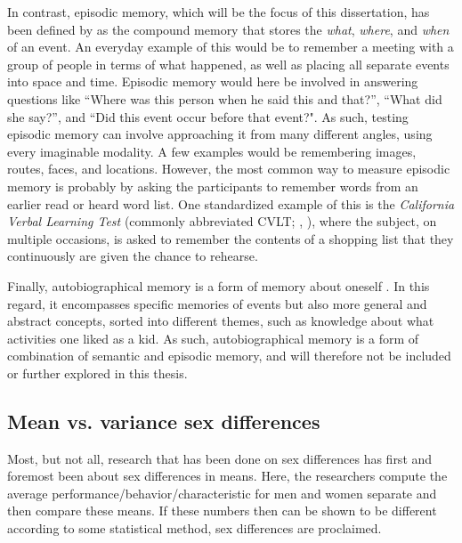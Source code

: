 In contrast, episodic memory, which will be the focus of this dissertation, has been defined by \textcite{Tulving1972,Tulving2002} as the compound memory that stores the \emph{what}, \emph{where}, and \emph{when} of an event. An everyday example of this would be to remember a meeting with a group of people in terms of what happened, as well as placing all separate events into space and time. Episodic memory would here be involved in answering questions like ``Where was this person when he said this and that?'', ``What did she say?'', and ``Did this event occur before that event?". As such, testing episodic memory can involve approaching it from many different angles, using every imaginable modality. A few examples would be remembering images, routes, faces, and locations. However, the most common way to measure episodic memory is probably by asking the participants to remember words from an earlier read or heard word list. One standardized example of this is the \emph{California Verbal Learning Test} (commonly abbreviated CVLT; \citeauthor{Delis1987}, \citeyear{Delis1987}), where the subject, on multiple occasions, is asked to remember the contents of a shopping list that they continuously are given the chance to rehearse.

Finally, autobiographical memory is a form of memory about oneself \parencite{Conway2000,Conway2005}. In this regard, it encompasses specific memories of events but also more general and abstract concepts, sorted into different themes, such as knowledge about what activities one liked as a kid. As such, autobiographical memory is a form of combination of semantic and episodic memory, and will therefore not be included or further explored in this thesis.

\subsection{Mean vs. variance sex differences} \label{Mean_vs_variance}

Most, but not all, research that has been done on sex differences has first and foremost been about sex differences in means. Here, the researchers compute the average performance/behavior/characteristic for men and women separate and then compare these means. If these numbers then can be shown to be different according to some statistical method, sex differences are proclaimed.

